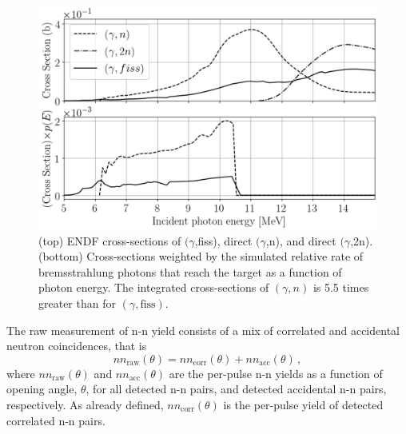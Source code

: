 \begin{figure}[]
\centering
    \includegraphics[width=\figsize\textwidth]{CrossSections.png}
    \caption{(top) ENDF cross-sections of $(\gamma$,fiss), direct $(\gamma$,n), and direct $(\gamma$,2n).
    (bottom) Cross-sections weighted by the simulated relative rate of bremsstrahlung photons that reach the target as a function of photon energy. The integrated cross-sections of $(\gamma, n)$ is 5.5 times greater than for $(\gamma, \text{fiss})$. }
    \label{fig:CrossSection}
\end{figure}

The raw measurement of n-n yield consists of a mix of correlated and accidental neutron coincidences, that is
\begin{equation}
\label{eq:corr_uncorr}
nn_{\text{raw}}(\theta)= nn_{\text{corr}}(\theta) + nn_{\text{acc}}(\theta) \, ,
\end{equation}
where $nn_{\text{raw}}(\theta)$ and $nn_{\text{acc}}(\theta)$ are the per-pulse n-n yields as a function of opening angle, $\theta$, for all detected n-n pairs, and detected accidental n-n pairs, respectively. As already defined, $ nn_{\text{corr}}(\theta)$ is the per-pulse yield of detected correlated n-n pairs.

